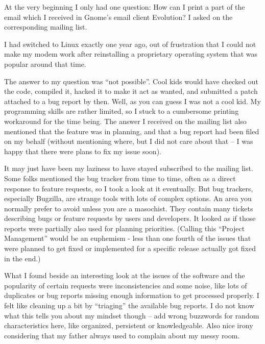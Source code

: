 

At the very beginning I only had one question: How can I print a part of the
email which I received in Gnome's email client Evolution? I asked on the
corresponding mailing list.

I had switched to Linux exactly one year ago, out of frustration that I
could not make my modem work after reinstalling a proprietary operating system
that was popular around that time.

The answer to my question was ``not possible''. Cool kids would have checked out
the code, compiled it, hacked it to make it act as wanted, and submitted a patch
attached to a bug report by then. Well, as you can guess I was not a cool kid.
My programming skills are rather limited, so I stuck to a cumbersome printing
workaround for the time being. The answer I received on the mailing list also
mentioned that the feature was in planning, and that a bug report had been filed
on my behalf (without mentioning where, but I did not care about that -- I was
happy that there were plans to fix my issue soon).

It may just have been my laziness to have stayed subscribed to the mailing list.
Some folks mentioned the bug tracker from time to time, often as a direct
response to feature requests, so I took a look at it eventually. But bug
trackers, especially Bugzilla, are strange tools with lots of complex options.
An area you normally prefer to avoid unless you are a masochist. They contain
many tickets describing bugs or feature requests by users and developers. It
looked as if those reports were partially also used for planning priorities.
(Calling this ``Project Management'' would be an euphemism - less than one
fourth of the issues that were planned to get fixed or implemented for a
specific release actually got fixed in the end.)

What I found beside an interesting look at the issues of the software and the
popularity of certain requests were inconsistencies and some noise, like lots of
duplicates or bug reports missing enough information to get processed properly.
I felt like cleaning up a bit by ``triaging'' the available bug reports. I do
not know what this tells you about my mindset though -- add wrong buzzwords for
random characteristics here, like organized, persistent or knowledgeable. Also
nice irony considering that my father always used to complain about my messy
room.

